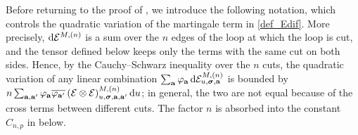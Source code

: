 Before returning to the proof of , we introduce the following notation, which controls the quadratic variation of the martingale term in \eqref{def_Edif}. More precisely, $\mathrm{d}\mathcal E^{M,(n)}$ is a sum over the $n$ edges of the loop at which the loop is cut, and the tensor defined below keeps only the terms with the same cut on both sides. Hence, by the Cauchy--Schwarz inequality over the $n$ cuts, the quadratic variation of any linear combination $\sum_{{\mathbf{a}}}\varphi_{{\mathbf{a}}}\,\mathrm{d}\mathcal E^{M,(n)}_{u,{\boldsymbol{\sigma}},{\mathbf{a}}}$ is bounded by $n\sum_{{\mathbf{a}},{\mathbf{a}}'}\varphi_{{\mathbf{a}}}\overline{\varphi_{{\mathbf{a}}'}}\,(\mathcal E\otimes\mathcal E)^{M,(n)}_{u,{\boldsymbol{\sigma}},{\mathbf{a}},{\mathbf{a}}'}\,\mathrm{d} u$; in general, the two are not equal because of the cross terms between different cuts. The factor $n$ is absorbed into the constant $C_{n,p}$ in  below.

